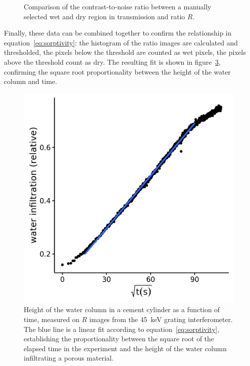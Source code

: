 \begin{figure}[htb]
\begin{subfigure}[b]{.49\textwidth}
    \caption{}
    \label{fig:wet-cement-cnr-ratio}
    \end{subfigure}
    \caption[CNR for water in cement.]{Comparison of the contrast-to-noise
    ratio between a manually selected wet and dry region in transmission and
ratio $R$.}
\label{fig:wet-cement-cnr}
\end{figure}

Finally, these data can be combined together to confirm the relationship in
equation~\eqref{eq:sorptivity}: the histogram of the ratio images are
calculated and thresholded, the pixels below the threshold are
counted as wet pixels, the pixels above the threshold count as dry. The
resulting fit is shown in figure~\ref{fig:position}, confirming the
square root proportionality between the height of the water column and time.

\begin{figure}[htb]
    \centering
    \includegraphics[width=\textwidth]{gfx/wet-cement/position.png}
    \caption[Water diffusion in cement.]{Height of the water column in a cement cylinder as a function
        of time, measured on $R$ images from the \SI{45}{\kilo\eV} grating
    interferometer. The blue line is a linear fit according to
    equation~\eqref{eq:sorptivity}, establishing the proportionality between
the square root of the elapsed time in the experiment and the height of the
water column infiltrating a porous material.}
    \label{fig:position}
\end{figure}

